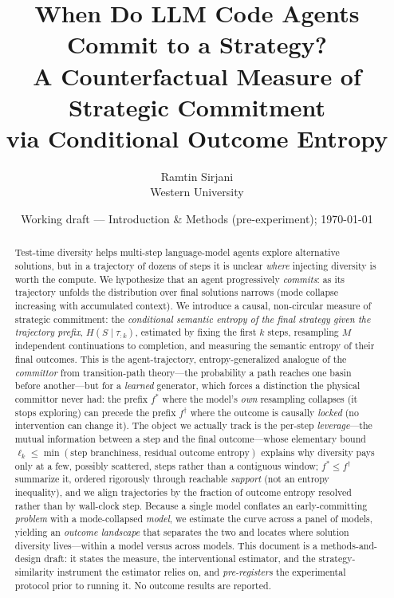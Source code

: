 \documentclass[11pt]{article}
\title{\textbf{When Do LLM Code Agents Commit to a Strategy?\\
A Counterfactual Measure of Strategic Commitment\\ via Conditional Outcome Entropy}}
\author{Ramtin Sirjani\\[2pt]
\small Western University}
\date{\small Working draft --- Introduction \& Methods (pre-experiment); \today}
\begin{document}
\maketitle

\begin{abstract}
\noindent
Test-time diversity helps multi-step language-model agents explore alternative
solutions, but in a trajectory of dozens of steps it is unclear \emph{where}
injecting diversity is worth the compute. We hypothesize that an agent
progressively \emph{commits}: as its trajectory unfolds the distribution over final
solutions narrows (mode collapse increasing with accumulated context). We introduce
a causal, non-circular measure of strategic commitment: the \emph{conditional
semantic entropy of the final strategy given the trajectory prefix},
$H(S \mid \tau_{:k})$, estimated by fixing the first $k$ steps, resampling $M$
independent continuations to completion, and measuring the semantic entropy of their
final outcomes. This is the agent-trajectory, entropy-generalized analogue of the
\emph{committor} from transition-path theory---the probability a path reaches one
basin before another---but for a \emph{learned} generator, which forces a
distinction the physical committor never had: the prefix $f^\ast$ where the model's
\emph{own} resampling collapses (it stops exploring) can precede the prefix
$f^\dagger$ where the outcome is causally \emph{locked} (no intervention can
change it). The object we actually track is the per-step \emph{leverage}---the
mutual information between a step and the final outcome---whose elementary bound
$\ell_k\le\min(\text{step branchiness},\,\text{residual outcome entropy})$ explains
why diversity pays only at a few, possibly scattered, steps rather than a contiguous
window; $f^\ast\!\le\!f^\dagger$ summarize it, ordered rigorously through reachable
\emph{support} (not an entropy inequality), and we align trajectories by the fraction
of outcome entropy resolved rather than by wall-clock step. Because a single model conflates an early-committing
\emph{problem} with a mode-collapsed \emph{model}, we estimate the curve across a
panel of models, yielding an \emph{outcome landscape} that separates the two and
locates where solution diversity lives---within a model versus across models. This
document is a methods-and-design draft: it states
the measure, the interventional estimator, and the strategy-similarity instrument
the estimator relies on, and \emph{pre-registers} the experimental protocol prior
to running it. No outcome results are reported.
\end{abstract}
\end{document}
